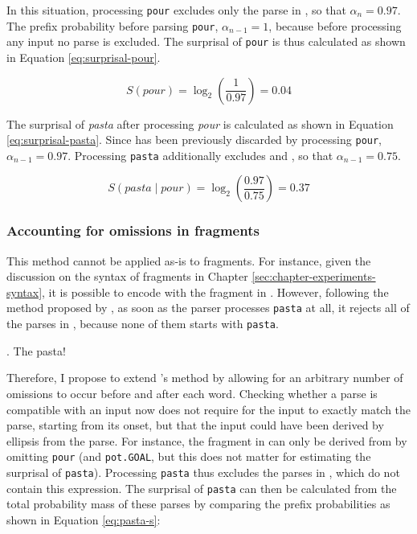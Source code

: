 In this situation, processing \texttt{pour} excludes only the parse in \Last[c], so that $\alpha_{n} = 0.97$. The prefix probability before parsing \texttt{pour}, $\alpha_{n-1} = 1$, because before processing any input no parse is excluded. The surprisal of \texttt{pour} is thus calculated as shown in Equation \ref{eq:surprisal-pour}.

\begin{equation}
 \displaystyle S(pour) = \log_2(\frac{1}{0.97}) = 0.04 \label{eq:surprisal-pour}
\end{equation}

The surprisal of \textit{pasta} after processing \textit{pour} is calculated as shown in Equation \ref{eq:surprisal-pasta}. Since \Last[c] has been previously discarded by processing \texttt{pour}, $\alpha_{n-1} = 0.97$. Processing \texttt{pasta} additionally excludes \Last[b] and \Last[d], so that $\alpha_{n-1} = 0.75$.

\begin{equation}
 \displaystyle S(pasta\mathbin{|}pour) = \log_2(\frac{0.97}{0.75}) = 0.37 \label{eq:surprisal-pasta}
\end{equation}

\subsubsection{Accounting for omissions in fragments}     

This method cannot be applied as-is to fragments. For instance, given the discussion on the syntax of fragments in Chapter \ref{sec:chapter-experiments-syntax}, it is possible to encode \Last[a] with the fragment in \Next. However, following the method proposed by \citet{hale2001}, as soon as the parser processes \texttt{pasta} at all, it rejects all of the parses in \Last, because none of them starts with \texttt{pasta}. 

\ex. The pasta!

Therefore, I propose to extend \citeauthor{hale2001}'s method by allowing for an arbitrary number of omissions to occur before and after each word. Checking whether a parse is compatible with an input now does not require for the input to exactly match the parse, starting from its onset, but that the input could have been derived by ellipsis from the parse. For instance, the fragment in \Last can only be derived from \LLast[a] by omitting \texttt{pour} (and \texttt{pot.GOAL}, but this does not matter for estimating the surprisal of \texttt{pasta}). Processing \texttt{pasta} thus excludes the parses in \LLast[b-d], which do not contain this expression. The surprisal of \texttt{pasta} can then be calculated from the total probability mass of these parses by comparing the prefix probabilities as shown in Equation \ref{eq:pasta-s}:

